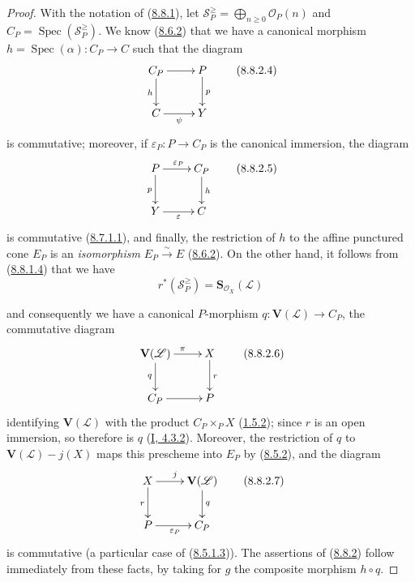 \begin{proof}
With the notation of (\hyperref[II.8.8.1]{8.8.1}), let
$\mathcal{S}_P^{\geqslant}=\bigoplus_{n\geqslant 0}\mathcal{O}_P(n)$ and
$C_P=\operatorname{Spec}(\mathcal{S}_P^{\geqslant})$. We know
(\hyperref[II.8.6.2]{8.6.2}) that we have a canonical morphism
$h=\operatorname{Spec}(\alpha):C_P\to C$ such that the diagram
\begin{equation}
\label{II.8.8.2.4}
  \xymatrix{
    C_P\ar[r]\ar[d]_{h} & P\ar[d]^{p}\\
    C\ar[r]_{\psi} & Y
  }
\tag{8.8.2.4}
\end{equation}
is commutative; moreover, if $\varepsilon_P:P\to C_P$ is the canonical
immersion, the diagram
\begin{equation}
\label{II.8.8.2.5}
  \xymatrix{
    P\ar[r]^{\varepsilon_P}\ar[d]_{p} & C_P\ar[d]^{h}\\
    Y\ar[r]_{\varepsilon} & C
  }
\tag{8.8.2.5}
\end{equation}
is commutative (\hyperref[II.8.7.1.1]{8.7.1.1}), and finally, the
restriction of $h$ to the affine punctured cone $E_P$ is an
\emph{isomorphism} $E_P\xrightarrow{\sim}E$ (\hyperref[II.8.6.2]{8.6.2}).
On the other hand, it follows from (\hyperref[II.8.8.1.4]{8.8.1.4}) that
we have
\[
  r^*(\mathcal{S}_P^{\geqslant})=
  \mathbf{S}_{\mathcal{O}_X}(\mathcal{L})
\]

and consequently we have a canonical $P$-morphism
$q:\mathbf{V}(\mathcal{L})\to C_P$, the commutative diagram
\begin{equation}
\label{II.8.8.2.6}
  \xymatrix{
    \mathbf{V}(\mathcal{L})\ar[r]^{\pi}\ar[d]_{q} & X\ar[d]^{r}\\
    C_P\ar[r] & P
  }
\tag{8.8.2.6}
\end{equation}
identifying $\mathbf{V}(\mathcal{L})$ with the product $C_P\times_P X$
(\hyperref[II.1.5.2]{1.5.2}); since $r$ is an open immersion, so
therefore is $q$ (\hyperref[I.4.3.2]{I, 4.3.2}). Moreover, the
restriction of $q$ to $\mathbf{V}(\mathcal{L})-j(X)$ maps this prescheme into
$E_P$ by (\hyperref[II.8.5.2]{8.5.2}), and the diagram
\begin{equation}
\label{II.8.8.2.7}
  \xymatrix{
    X\ar[r]^{j}\ar[d]_{r} & \mathbf{V}(\mathcal{L})\ar[d]^{q}\\
    P\ar[r]_{\varepsilon_P} & C_P
  }
\tag{8.8.2.7}
\end{equation}
is commutative (a particular case of
(\hyperref[II.8.5.1.3]{8.5.1.3})). The assertions of
(\hyperref[II.8.8.2]{8.8.2}) follow immediately from these facts, by
taking for $g$ the composite morphism $h\circ q$.
\end{proof}

